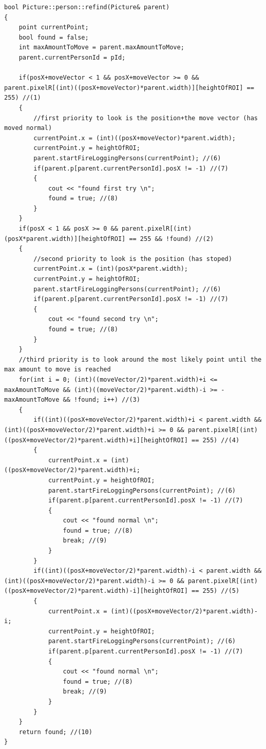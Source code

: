 \begin{lstlisting}
bool Picture::person::refind(Picture& parent)
{
	point currentPoint;
	bool found = false;
	int maxAmountToMove = parent.maxAmountToMove;
	parent.currentPersonId = pId;

	if(posX+moveVector < 1 && posX+moveVector >= 0 && parent.pixelR[(int)((posX+moveVector)*parent.width)][heightOfROI] == 255) //(1)
	{
		//first priority to look is the position+the move vector (has moved normal)
		currentPoint.x = (int)((posX+moveVector)*parent.width);
		currentPoint.y = heightOfROI;
		parent.startFireLoggingPersons(currentPoint); //(6)
		if(parent.p[parent.currentPersonId].posX != -1) //(7)
		{
			cout << "found first try \n";
			found = true; //(8)
		}
	} 
	if(posX < 1 && posX >= 0 && parent.pixelR[(int)(posX*parent.width)][heightOfROI] == 255 && !found) //(2)
	{
		//second priority to look is the position (has stoped)
		currentPoint.x = (int)(posX*parent.width);
		currentPoint.y = heightOfROI;
		parent.startFireLoggingPersons(currentPoint); //(6)
		if(parent.p[parent.currentPersonId].posX != -1) //(7)
		{
			cout << "found second try \n";
			found = true; //(8)
		}
	} 
	//third priority is to look around the most likely point until the max amount to move is reached
	for(int i = 0; (int)((moveVector/2)*parent.width)+i <= maxAmountToMove && (int)((moveVector/2)*parent.width)-i >= -maxAmountToMove && !found; i++) //(3)
	{
		if((int)((posX+moveVector/2)*parent.width)+i < parent.width && (int)((posX+moveVector/2)*parent.width)+i >= 0 && parent.pixelR[(int)((posX+moveVector/2)*parent.width)+i][heightOfROI] == 255) //(4)
		{
			currentPoint.x = (int)((posX+moveVector/2)*parent.width)+i;
			currentPoint.y = heightOfROI;
			parent.startFireLoggingPersons(currentPoint); //(6)
			if(parent.p[parent.currentPersonId].posX != -1) //(7)
			{
				cout << "found normal \n";
				found = true; //(8)
				break; //(9)
			}
		}
		if((int)((posX+moveVector/2)*parent.width)-i < parent.width && (int)((posX+moveVector/2)*parent.width)-i >= 0 && parent.pixelR[(int)((posX+moveVector/2)*parent.width)-i][heightOfROI] == 255) //(5)
		{
			currentPoint.x = (int)((posX+moveVector/2)*parent.width)-i;
			currentPoint.y = heightOfROI;
			parent.startFireLoggingPersons(currentPoint); //(6)
			if(parent.p[parent.currentPersonId].posX != -1) //(7)
			{
				cout << "found normal \n";
				found = true; //(8)
				break; //(9)
			}
		}
	}
	return found; //(10)
}
\end{lstlisting}
